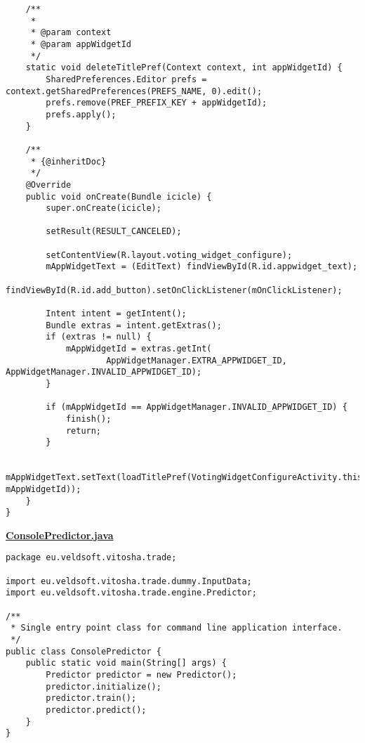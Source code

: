 \begin{verbatim}
    /**
     *
     * @param context
     * @param appWidgetId
     */
    static void deleteTitlePref(Context context, int appWidgetId) {
        SharedPreferences.Editor prefs = context.getSharedPreferences(PREFS_NAME, 0).edit();
        prefs.remove(PREF_PREFIX_KEY + appWidgetId);
        prefs.apply();
    }

    /**
     * {@inheritDoc}
     */
    @Override
    public void onCreate(Bundle icicle) {
        super.onCreate(icicle);

        setResult(RESULT_CANCELED);

        setContentView(R.layout.voting_widget_configure);
        mAppWidgetText = (EditText) findViewById(R.id.appwidget_text);
        findViewById(R.id.add_button).setOnClickListener(mOnClickListener);

        Intent intent = getIntent();
        Bundle extras = intent.getExtras();
        if (extras != null) {
            mAppWidgetId = extras.getInt(
                    AppWidgetManager.EXTRA_APPWIDGET_ID, AppWidgetManager.INVALID_APPWIDGET_ID);
        }

        if (mAppWidgetId == AppWidgetManager.INVALID_APPWIDGET_ID) {
            finish();
            return;
        }

        mAppWidgetText.setText(loadTitlePref(VotingWidgetConfigureActivity.this, mAppWidgetId));
    }
}
\end{verbatim}

\textbf{\underline{ConsolePredictor.java}}
\begin{verbatim}
package eu.veldsoft.vitosha.trade;

import eu.veldsoft.vitosha.trade.dummy.InputData;
import eu.veldsoft.vitosha.trade.engine.Predictor;

/**
 * Single entry point class for command line application interface.
 */
public class ConsolePredictor {
    public static void main(String[] args) {
        Predictor predictor = new Predictor();
        predictor.initialize();
        predictor.train();
        predictor.predict();
    }
}
\end{verbatim}


